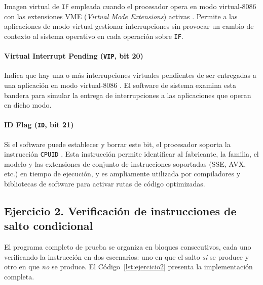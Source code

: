 \documentclass[a4paper,12pt]{article}
\begin{document}
Imagen virtual de \texttt{IF} empleada cuando el procesador opera en modo virtual-8086 con las extensiones VME (\textit{Virtual Mode Extensions}) activas \cite{stallings2019computer}. Permite a las aplicaciones de modo virtual gestionar interrupciones sin provocar un cambio de contexto al sistema operativo en cada operación sobre \texttt{IF}.

\paragraph*{Virtual Interrupt Pending (\texttt{VIP}, bit 20)}

Indica que hay una o más interrupciones virtuales pendientes de ser entregadas a una aplicación en modo virtual-8086 \cite{stallings2019computer}. El software de sistema examina esta bandera para simular la entrega de interrupciones a las aplicaciones que operan en dicho modo.

\paragraph*{ID Flag (\texttt{ID}, bit 21)}

Si el software puede establecer y borrar este bit, el procesador soporta la instrucción \texttt{CPUID} \cite{irvine2020assembly}. Esta instrucción permite identificar al fabricante, la familia, el modelo y las extensiones de conjunto de instrucciones soportadas (SSE, AVX, etc.) en tiempo de ejecución, y es ampliamente utilizada por compiladores y bibliotecas de software para activar rutas de código optimizadas.

\subsection{Ejercicio 2. Verificación de instrucciones de salto condicional}

El programa completo de prueba se organiza en bloques consecutivos, cada uno verificando la instrucción en dos escenarios: uno en que el salto \textit{sí} se produce y otro en que \textit{no} se produce. El Código~\ref{lst:ejercicio2} presenta la implementación completa.
\end{document}
